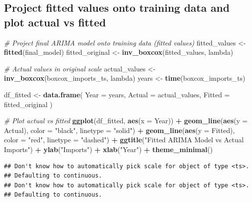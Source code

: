 \documentclass[
]{article}
\newenvironment{Shaded}{\begin{snugshade}}{\end{snugshade}}
\newcommand{\AttributeTok}[1]{\textcolor[rgb]{0.13,0.29,0.53}{#1}}
\newcommand{\CommentTok}[1]{\textcolor[rgb]{0.56,0.35,0.01}{\textit{#1}}}
\newcommand{\FunctionTok}[1]{\textcolor[rgb]{0.13,0.29,0.53}{\textbf{#1}}}
\newcommand{\NormalTok}[1]{#1}
\newcommand{\OtherTok}[1]{\textcolor[rgb]{0.56,0.35,0.01}{#1}}
\newcommand{\SpecialCharTok}[1]{\textcolor[rgb]{0.81,0.36,0.00}{\textbf{#1}}}
\newcommand{\StringTok}[1]{\textcolor[rgb]{0.31,0.60,0.02}{#1}}
\begin{document}
\subsection{Project fitted values onto training data and plot actual vs
fitted}\label{project-fitted-values-onto-training-data-and-plot-actual-vs-fitted}

\begin{Shaded}
\begin{Highlighting}[]
\CommentTok{\# Project final ARIMA model onto training data (fitted values)}
\NormalTok{fitted\_values }\OtherTok{\textless{}{-}} \FunctionTok{fitted}\NormalTok{(final\_model)}
\NormalTok{fitted\_original }\OtherTok{\textless{}{-}} \FunctionTok{inv\_boxcox}\NormalTok{(fitted\_values, lambda)}

\CommentTok{\# Actual values in original scale}
\NormalTok{actual\_values }\OtherTok{\textless{}{-}} \FunctionTok{inv\_boxcox}\NormalTok{(boxcox\_imports\_ts, lambda)}
\NormalTok{years }\OtherTok{\textless{}{-}} \FunctionTok{time}\NormalTok{(boxcox\_imports\_ts)}

\NormalTok{df\_fitted }\OtherTok{\textless{}{-}} \FunctionTok{data.frame}\NormalTok{(}
  \AttributeTok{Year =}\NormalTok{ years,}
  \AttributeTok{Actual =}\NormalTok{ actual\_values,}
  \AttributeTok{Fitted =}\NormalTok{ fitted\_original}
\NormalTok{)}

\CommentTok{\# Plot actual vs fitted}
\FunctionTok{ggplot}\NormalTok{(df\_fitted, }\FunctionTok{aes}\NormalTok{(}\AttributeTok{x =}\NormalTok{ Year)) }\SpecialCharTok{+}
  \FunctionTok{geom\_line}\NormalTok{(}\FunctionTok{aes}\NormalTok{(}\AttributeTok{y =}\NormalTok{ Actual), }\AttributeTok{color =} \StringTok{"black"}\NormalTok{, }\AttributeTok{linetype =} \StringTok{"solid"}\NormalTok{) }\SpecialCharTok{+}
  \FunctionTok{geom\_line}\NormalTok{(}\FunctionTok{aes}\NormalTok{(}\AttributeTok{y =}\NormalTok{ Fitted), }\AttributeTok{color =} \StringTok{"red"}\NormalTok{, }\AttributeTok{linetype =} \StringTok{"dashed"}\NormalTok{) }\SpecialCharTok{+}
  \FunctionTok{ggtitle}\NormalTok{(}\StringTok{"Fitted ARIMA Model vs Actual Imports"}\NormalTok{) }\SpecialCharTok{+}
  \FunctionTok{ylab}\NormalTok{(}\StringTok{"Imports"}\NormalTok{) }\SpecialCharTok{+} \FunctionTok{xlab}\NormalTok{(}\StringTok{"Year"}\NormalTok{) }\SpecialCharTok{+}
  \FunctionTok{theme\_minimal}\NormalTok{()}
\end{Highlighting}
\end{Shaded}

\begin{verbatim}
## Don't know how to automatically pick scale for object of type <ts>.
## Defaulting to continuous.
## Don't know how to automatically pick scale for object of type <ts>.
## Defaulting to continuous.
\end{verbatim}
\end{document}
